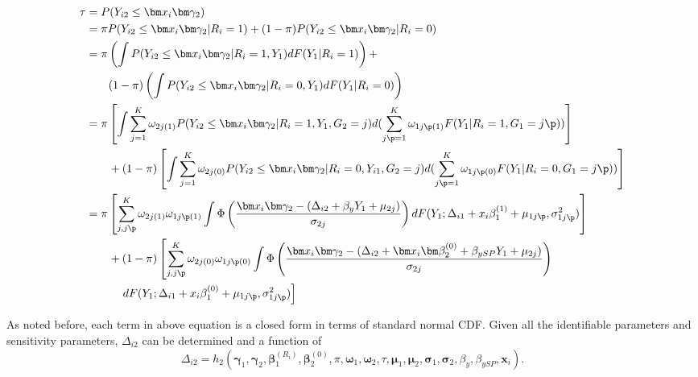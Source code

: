 \begin{description}
\begin{align*}
\tau & = P(Y_{i2} \leq \bm x_i \bm \gamma_2)                                                                                                                                                                                                             \\
     & = \pi P(Y_{i2} \le \bm x_i \bm \gamma_2 | R_i= 1) +  (1- \pi) P(Y_{i2} \le \bm x_i \bm \gamma_2 | R_i= 0)                                                                                                                                             \\
     & = \pi \left(\int P(Y_{i2} \le \bm x_i \bm \gamma_2|R_i = 1, Y_1) dF(Y_1|R_i = 1) \right) +  \\
& \qquad (1 - \pi) \left( \int P(Y_{i2} \le \bm x_i \bm \gamma_2|R_i = 0, Y_1) dF(Y_1|R_i = 0) \right)                                                                  \\
     & = \pi \left[ \int \sum_{j=1}^K \omega_{2j(1)} P(Y_{i2} \le \bm x_i \bm\gamma_2 |R_i = 1, Y_{1}, G_2= j)d(\sum_{j\p = 1}^K \omega_{1j\p(1)}F(Y_1|R_i = 1, G_1 = j\p))  \right]                                                           \\
     & \qquad  + (1-\pi) \left[ \int \sum_{j=1}^K \omega_{2j(0)} P(Y_{i2} \le \bm x_i \bm\gamma_2 |R_i = 0, Y_{i1}, G_2= j)d(\sum_{j\p = 1}^K \omega_{1j\p(0)}F(Y_1|R_i = 0, G_1 = j\p))  \right]                                               \\
     & = \pi \left[ \sum_{j, j\p}^K \omega_{2j(1)} \omega_{1j\p(1)} \int \Phi \left( \frac{\bm x_i \bm\gamma_2 - (\Delta_{i2} + \beta_y Y_{1} + \mu_{2j})}{\sigma_{2j}} \right)dF(Y_{1}; \Delta_{i1} + x_{i}\beta_1^{(1)} + \mu_{1j\p}, \sigma_{1j\p}^2) \right] \\
     &  \qquad + (1 - \pi)\left[ \sum_{j, j\p}^K \omega_{2j(0)} \omega_{1j\p(0)} \int \Phi \left( \frac{\bm x_i \bm\gamma_2 - (\Delta_{i2} + \bm x_i \bm\beta_2^{(0)} + \beta_{ySP} Y_{1} + \mu_{2j})}{\sigma_{2j}} \right) \right. \\
& \qquad \quad \left. dF(Y_{1}; \Delta_{i1} + x_{i}\beta_1^{(0)} + \mu_{1j\p}, \sigma_{1j\p}^2) \right]
\end{align*}

As noted before, each term in above equation is a closed form in terms of standard normal CDF.
Given all the identifiable parameters and sensitivity parameters, $\Delta_{i2}$ can be determined and a function of
\begin{displaymath}
\Delta_{i2} = h_2(\bm \gamma_1, \bm \gamma_2, \bm \beta_1^{(R_i)}, \bm \beta_2^{(0)}, \pi, \bm \omega_1, \bm \omega_2, \tau,\bm  \mu_1, \bm \mu_2, \bm \sigma_1, \bm \sigma_2, \beta_y, \beta_{ySP}, \bm x_i).
\end{displaymath}

\end{description}

